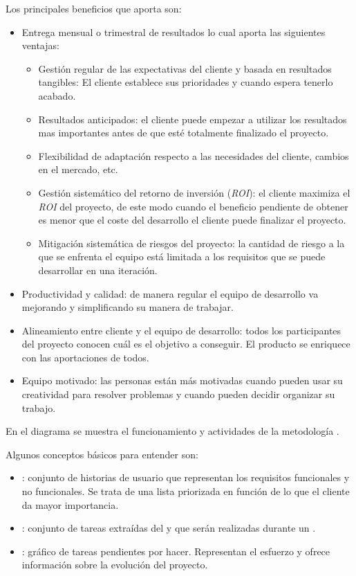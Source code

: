 Los principales beneficios que aporta \scrum{} son:
\begin{itemize}
 \item Entrega mensual o trimestral de resultados lo cual aporta las siguientes ventajas:
  \begin{itemize}
   \item Gestión regular de las expectativas del cliente y basada en resultados tangibles: El cliente establece sus prioridades y cuando espera tenerlo acabado.
   \item Resultados anticipados: el cliente puede empezar a utilizar los resultados mas importantes antes de que esté totalmente finalizado el proyecto.
   \item Flexibilidad de adaptación respecto a las necesidades del cliente, cambios en el mercado, etc.
   \item Gestión sistemático del retorno de inversión (\textit{ROI}): el cliente maximiza el \textit{ROI} del proyecto, de este modo cuando el beneficio pendiente de obtener es menor que el coste del desarrollo el cliente puede finalizar el proyecto.
   \item Mitigación sistemática de riesgos del proyecto: la cantidad de riesgo a la que se enfrenta el equipo está limitada a los requisitos que se puede desarrollar en una iteración.
  \end{itemize}
 \item Productividad y calidad: de manera regular el equipo de desarrollo va mejorando y simplificando su manera de trabajar.
 \item Alineamiento entre cliente y el equipo de desarrollo: todos los participantes del proyecto conocen cuál es el objetivo a conseguir. El producto se enriquece con las aportaciones de todos.
 \item Equipo motivado: las personas están más motivadas cuando pueden usar su creatividad para resolver problemas y cuando pueden decidir organizar su trabajo.
\end{itemize}

En el diagrama   se muestra el funcionamiento y actividades de la metodología \scrum{}.


Algunos conceptos básicos para entender \scrum{} son:
\begin{itemize}
 \item \productbacklog{}: conjunto de historias de usuario que representan los requisitos funcionales y no funcionales. Se trata de una lista priorizada en función de lo que el cliente da mayor importancia.
 \item \sprintbacklog{}: conjunto de tareas extraídas del \productbacklog{} y que serán realizadas durante un \sprint{}.
 \item \burndownchart{}: gráfico de tareas pendientes por hacer. Representan el esfuerzo y ofrece información sobre la evolución del proyecto.
\end{itemize}

